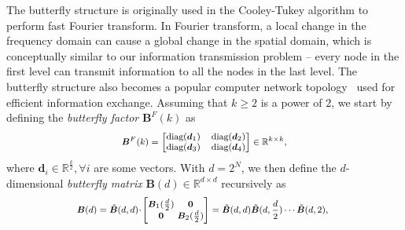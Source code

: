 \documentclass{article} %
\begin{document}
The butterfly structure is originally used in the Cooley-Tukey algorithm to perform fast Fourier transform. In Fourier transform, a local change in the frequency domain can cause a global change in the spatial domain, which is conceptually similar to our information transmission problem -- every node in the first level can transmit information to all the nodes in the last level. The butterfly structure also becomes a popular computer network topology~\cite{solihin2015fundamentals,li2011linear} used for efficient information exchange. Assuming that $k\geq 2$ is a power of $2$, we start by defining the \emph{butterfly factor} $\bm{B}^F(k)$ as
\begin{equation}\label{eq:but_factor}
\footnotesize
\begin{aligned}
    \bm{B}^F(k)=\begin{bmatrix}
    \text{diag}(\bm{d}_1) & \text{diag}(\bm{d}_2) \\
    \text{diag}(\bm{d}_3) & \text{diag}(\bm{d}_4)
    \end{bmatrix}\in\mathbb{R}^{k\times k},
\end{aligned}
\end{equation}
where $\bm{d}_i\in\mathbb{R}^{\frac{k}{2}},\forall i$ are some vectors. With $d=2^N$, we then define the $d$-dimensional \emph{butterfly matrix} $\bm{B}(d)\in\mathbb{R}^{d\times d}$ recursively as
\begin{equation}
\footnotesize
\begin{aligned}
    \!\!\bm{B}(d)=\tilde{\bm{B}}(d,d)\!\cdot\!\begin{bmatrix}
    \bm{B}_1(\frac{d}{2})\!\!\!\!\! & \bm{0} \\
    \bm{0}\!\!\!\!\! &\bm{B}_2(\frac{d}{2})
    \end{bmatrix}= \tilde{\bm{B}}(d,d)\tilde{\bm{B}}(d,\frac{d}{2})\cdots\tilde{\bm{B}}(d,2),
\end{aligned}
\end{equation}
\end{document}
